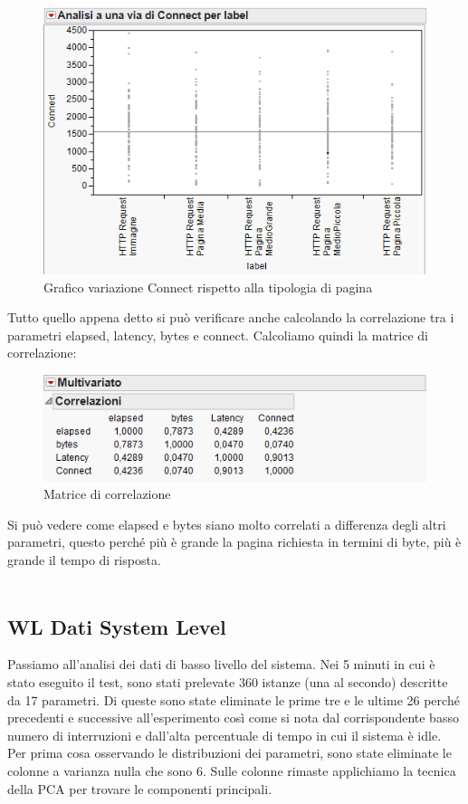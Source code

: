 		\begin{figure}[H]
			\centering
			\includegraphics[scale=0.85]{./immagine/grafico_connect.png}
			\caption{Grafico variazione Connect rispetto alla tipologia di pagina}
			\label{fig:grafico_connect}
		\end{figure}
		
		Tutto quello appena detto si può verificare anche calcolando la correlazione tra i parametri elapsed, latency, bytes e connect. Calcoliamo quindi la matrice di correlazione:\\
		
		\begin{figure}[H]
			\centering
			\includegraphics[scale=0.85]{./immagine/correlazione.png}
			\caption{Matrice di correlazione}
			\label{fig:correlazione}
		\end{figure}
		
		Si può vedere come elapsed e bytes siano molto correlati a differenza degli altri parametri, questo perché più è grande la pagina richiesta in termini di byte, più è grande il tempo di risposta.\\\\
		
		\subsection{WL Dati System Level}
		Passiamo all'analisi dei dati di basso livello del sistema. Nei 5 minuti in cui è stato eseguito il test, sono stati prelevate 360 istanze (una al secondo) descritte da 17 parametri. Di queste sono state eliminate le prime tre e le ultime 26 perché precedenti e successive all'esperimento così come si nota dal corrispondente basso numero di interruzioni e dall'alta percentuale di tempo in cui il sistema è idle.\\
		Per prima cosa osservando le distribuzioni dei parametri, sono state eliminate le colonne a varianza nulla che sono 6. Sulle colonne rimaste applichiamo la tecnica della PCA per trovare le componenti principali.
		
